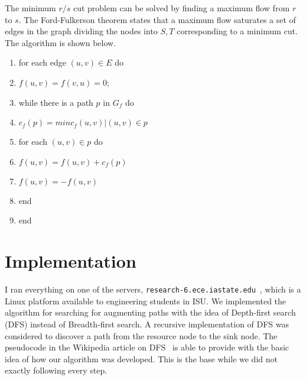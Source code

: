 \documentclass[11pt]{article}
\def\vx{\mathbf{x}}
\def\vc{\mathbf{c}}
\begin{document}
The minimum $r/s$ cut problem can be solved by finding a maximum flow from $r$ to $s$. The Ford-Fulkerson theorem states that a maximum flow saturates a set of edges in the graph dividing the nodes into ${S,T}$ corresponding to a minimum cut. The algorithm is shown below.
\begin{enumerate}
  \item for each edge $(u, v)\in E$ do
  \item \quad $f(u, v)=f(v, u)=0$;
  \item while there is a path $p$ in $G_f$ do
  \item \quad $c_f(p)=min{c_f(u,v)|(u,v)\in p}$
  \item \quad for each $(u,v)\in p$ do
  \item \quad\quad $f(u,v)=f(u,v)+c_f(p)$
  \item \quad\quad $f(u,v)=-f(u,v)$
  \item \quad end
  \item end
\end{enumerate}

\section{Implementation}
I ran everything on one of the servers, \texttt{research-6.ece.iastate.edu}~\cite{Servers}, which is a Linux platform available to engineering students in ISU. We implemented the algorithm for searching for augmenting paths with the idea of Depth-first search (DFS) instead of Breadth-first search. A recursive implementation of DFS was considered to discover a path from the resource node to the sink node. The pseudocode in the Wikipedia article on DFS~\cite{DFS} is able to provide with the basic idea of how our algorithm was developed. This is the base while we did not exactly following every step.%
\end{document}
